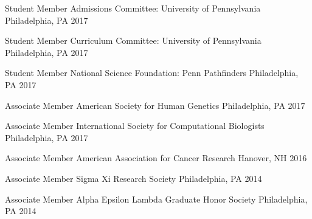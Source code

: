 



\begin{cvhonors}

  \cvhonor
    {Student Member} %
    {Admissions Committee: University of Pennsylvania} %
    {Philadelphia, PA} %
    {2017}

  \cvhonor
    {Student Member} %
    {Curriculum Committee: University of Pennsylvania} %
    {Philadelphia, PA} %
    {2017}

  \cvhonor
    {Student Member} %
    {National Science Foundation: Penn Pathfinders} %
    {Philadelphia, PA} %
    {2017} %

  \cvhonor
    {Associate Member} %
    {American Society for Human Genetics} %
    {Philadelphia, PA} %
    {2017}

  \cvhonor
    {Associate Member} %
    {International Society for Computational Biologists} %
    {Philadelphia, PA} %
    {2017} %

  \cvhonor
    {Associate Member} %
    {American Association for Cancer Research} %
    {Hanover, NH} %
    {2016} %

  \cvhonor
    {Associate Member} %
    {Sigma Xi Research Society} %
    {Philadelphia, PA} %
    {2014} %

  \cvhonor
    {Associate Member} %
    {Alpha Epsilon Lambda Graduate Honor Society} %
    {Philadelphia, PA} %
    {2014} %

\end{cvhonors}



